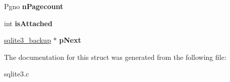 \begin{DoxyCompactItemize}
\item 
Pgno {\bfseries n\+Pagecount}\hypertarget{structsqlite3__backup_a98599d5a3a13173a6a126242d1fbbaa8}{}\label{structsqlite3__backup_a98599d5a3a13173a6a126242d1fbbaa8}

\item 
int {\bfseries is\+Attached}\hypertarget{structsqlite3__backup_af515f0d9265847d820cbaad41cef78ae}{}\label{structsqlite3__backup_af515f0d9265847d820cbaad41cef78ae}

\item 
\hyperlink{structsqlite3__backup}{sqlite3\+\_\+backup} $\ast$ {\bfseries p\+Next}\hypertarget{structsqlite3__backup_a3a87332e045fe4a477fe262409c6011a}{}\label{structsqlite3__backup_a3a87332e045fe4a477fe262409c6011a}

\end{DoxyCompactItemize}


The documentation for this struct was generated from the following file\+:\begin{DoxyCompactItemize}
\item 
sqlite3.\+c\end{DoxyCompactItemize}
